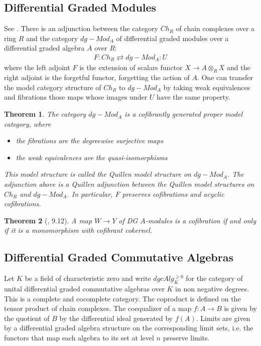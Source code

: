 \documentclass{scrartcl}
\theoremstyle{plain}
\newtheorem{theorem}{Theorem}[section]
\theoremstyle{definition}
\begin{document}
\subsection{Differential Graded Modules}\label{subsec:model-dg-mod}
See \cite{barthel2013six}.
There is an adjunction between the category $Ch_R$ of chain complexes over a ring $R$ and the category $dg-Mod_A$ of differential graded modules over a differential graded algebra $A$ over $R$:
\begin{align*}
    F\colon Ch_R\rightleftarrows dg-Mod_A \colon U
\end{align*}
where the left adjoint $F$ is the extension of scalars functor $X\to A\otimes_R X$ and the right adjoint is the forgetful functor, forgetting the action of $A$. One can transfer the model category structure of $Ch_R$ to $dg-Mod_A$ by taking weak equivalences and fibrations those maps whose images under $U$ have the same property.
\begin{theorem}
    The category $dg-Mod_A$ is a cofibrantly generated proper model category, where
    \begin{itemize}
        \item the fibrations are the degreewise surjective maps
        \item the weak equivalences are the quasi-isomorphisms
    \end{itemize}
    This model structure is called the Quillen model structure on $dg-Mod_A$. 
    The adjunction above is a Quillen adjunction between the Quillen model structures on $Ch_R$ and $dg-Mod_A$. In particular, $F$ preserves cofibrations and acyclic cofibrations. 
\end{theorem} 

\begin{theorem}[\cite{barthel2013six}, 9.12]\label{thm:dg-module-cofibrant-cokernel}
    A map $W\to Y$ of DG $A$-modules is a cofibration if and only if it is a monomorphism with cofibrant cokernel. 
\end{theorem}

\subsection{Differential Graded Commutative Algebras}
Let $K$ be a field of characteristic zero and write $dgcAlg_K^{\geq 0}$ for the category of unital differential graded commutative algebras over $K$ in non negative degrees. This is a complete and cocomplete category. The coproduct is defined on the tensor product of chain complexes. The coequalizer of a map $f\colon A\to B$ is given by the quotient of $B$ by the differential ideal generated by $f(A)$. Limits are given by a differential graded algebra structure on the corresponding limit sets, i.e. the functors that map each algebra to its set at level $n$ preserve limits. 
\end{document}
